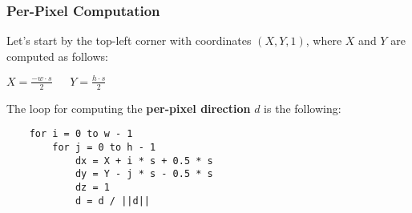 \documentclass{article}
\begin{document}
\subsubsection{Per-Pixel Computation}
Let's start by the top-left corner with coordinates $ (X, Y, 1) $, where $ X $ and $ Y $ are computed as follows:
\begin{center}
    $ X = \displaystyle\frac{- w \cdot s}{2} \ \ \ \ \ \ \ Y = \displaystyle\frac{h \cdot s}{2} $
\end{center}
The loop for computing the \textbf{per-pixel direction} $ d $ is the following:
\begin{verbatim}
    for i = 0 to w - 1
        for j = 0 to h - 1
            dx = X + i * s + 0.5 * s
            dy = Y - j * s - 0.5 * s
            dz = 1
            d = d / ||d||
\end{verbatim}
\newpage
\end{document}
